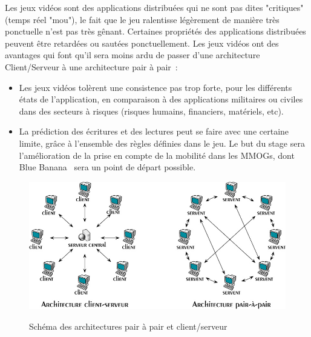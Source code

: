 	\par Les jeux vidéos sont des applications distribuées qui ne sont pas dites "critiques" (temps réel "mou"), le fait que le jeu ralentisse légèrement de manière très ponctuelle n'est pas très gênant. Certaines propriétés des applications distribuées peuvent être retardées ou sautées ponctuellement. Les jeux vidéos ont des avantages qui font qu'il sera moins ardu de passer d'une architecture Client/Serveur à une architecture pair à pair~\cite{1267692}:
	\begin{itemize}
		\renewcommand{\labelitemi}{$\bullet$}
		\item Les jeux vidéos tolèrent une consistence pas trop forte, pour les différents états de l'application, en comparaison à des applications militaires ou civiles dans des secteurs à risques (risques humains, financiers, matériels, etc).
		\item La prédiction des écritures et des lectures peut se faire avec une certaine limite, grâce à l'ensemble des règles définies dans le jeu. Le but du stage sera l'amélioration de la prise en compte de la mobilité dans les MMOGs, dont Blue Banana~\cite{191} sera un point de départ possible.
	\end{itemize}
	\vspace{1cm}
	\begin{figure}[!h]
	\centering
	\includegraphics[scale=0.5]{./Ressources/Images/p2p-85145.png}\\
	\caption{Schéma des architectures pair à pair et client/serveur}
	\label{P2P/ClServ}
	\end{figure} 
\newpage
